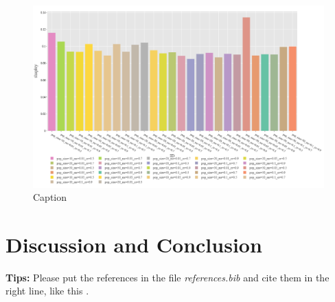 \documentclass{article}
\begin{document}
\begin{figure}[h!]
    \centering
    \includegraphics[width=1\linewidth]{Graphs/Katsuura/Shapley_Values.png}
    \caption{Caption}
    \label{fig:enter-label}
\end{figure}



\section{Discussion and Conclusion}\label{sec:dis&res}


    
    
 
 \textbf{Tips:} Please put the references in the file \emph{references.bib} and cite them in the right line, like this \cite{hadash2018estimate}.


\clearpage
  
  
\end{document}

